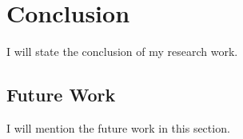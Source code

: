 \chapter{Conclusion}
\label{chap:conclusion}
I will state the conclusion of my research work. 

\section{Future Work}
I will mention the future work in this section.